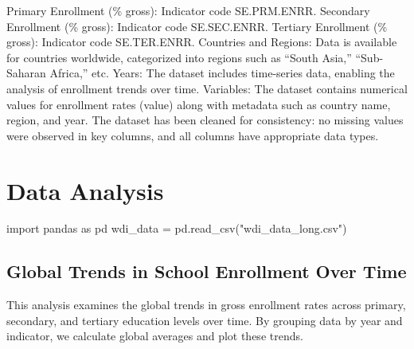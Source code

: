 \documentclass[
  letterpaper,
  DIV=11,
  numbers=noendperiod]{scrartcl}
\newenvironment{Shaded}{\begin{snugshade}}{\end{snugshade}}
\newcommand{\ImportTok}[1]{\textcolor[rgb]{0.00,0.46,0.62}{#1}}
\newcommand{\NormalTok}[1]{\textcolor[rgb]{0.00,0.23,0.31}{#1}}
\newcommand{\OperatorTok}[1]{\textcolor[rgb]{0.37,0.37,0.37}{#1}}
\newcommand{\StringTok}[1]{\textcolor[rgb]{0.13,0.47,0.30}{#1}}
\begin{document}
Primary Enrollment (\% gross): Indicator code SE.PRM.ENRR. Secondary
Enrollment (\% gross): Indicator code SE.SEC.ENRR. Tertiary Enrollment
(\% gross): Indicator code SE.TER.ENRR. Countries and Regions: Data is
available for countries worldwide, categorized into regions such as
``South Asia,'' ``Sub-Saharan Africa,'' etc. Years: The dataset includes
time-series data, enabling the analysis of enrollment trends over time.
Variables: The dataset contains numerical values for enrollment rates
(value) along with metadata such as country name, region, and year. The
dataset has been cleaned for consistency: no missing values were
observed in key columns, and all columns have appropriate data types.

\section{Data Analysis}\label{data-analysis}

\begin{Shaded}
\begin{Highlighting}[]
\ImportTok{import}\NormalTok{ pandas }\ImportTok{as}\NormalTok{ pd}
\NormalTok{wdi\_data }\OperatorTok{=}\NormalTok{ pd.read\_csv(}\StringTok{"wdi\_data\_long.csv"}\NormalTok{)}
\end{Highlighting}
\end{Shaded}

\subsection{Global Trends in School Enrollment Over
Time}\label{global-trends-in-school-enrollment-over-time}

This analysis examines the global trends in gross enrollment rates
across primary, secondary, and tertiary education levels over time. By
grouping data by year and indicator, we calculate global averages and
plot these trends.
\end{document}
